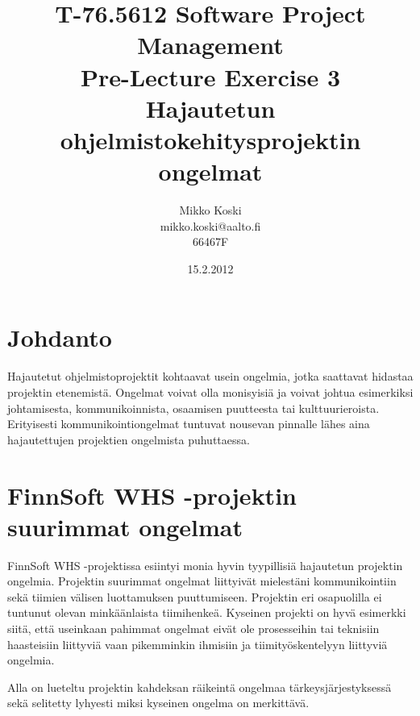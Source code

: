 \documentclass[a4paper]{article}
\begin{document}
\title{\small T-76.5612 Software Project Management \\ Pre-Lecture Exercise 3 \\ \huge Hajautetun ohjelmistokehitysprojektin ongelmat}
\date{15.2.2012}
\author{Mikko Koski \\ mikko.koski@aalto.fi \\ 66467F}
\maketitle

\normalsize

\section{Johdanto}

Hajautetut ohjelmistoprojektit kohtaavat usein ongelmia, jotka saattavat hidastaa projektin etenemistä. Ongelmat voivat olla monisyisiä ja voivat johtua esimerkiksi johtamisesta, kommunikoinnista, osaamisen puutteesta tai kulttuurieroista. Erityisesti kommunikointiongelmat tuntuvat nousevan pinnalle lähes aina hajautettujen projektien ongelmista puhuttaessa.

\section{FinnSoft WHS -projektin suurimmat ongelmat}

FinnSoft WHS -projektissa esiintyi monia hyvin tyypillisiä hajautetun projektin ongelmia. Projektin suurimmat ongelmat liittyivät mielestäni kommunikointiin sekä tiimien välisen luottamuksen puuttumiseen. Projektin eri osapuolilla ei tuntunut olevan minkäänlaista tiimihenkeä. Kyseinen projekti on hyvä esimerkki siitä, että useinkaan pahimmat ongelmat eivät ole prosesseihin tai teknisiin haasteisiin liittyviä vaan pikemminkin ihmisiin ja tiimityöskentelyyn liittyviä ongelmia.

Alla on lueteltu projektin kahdeksan räikeintä ongelmaa tärkeysjärjestyksessä sekä selitetty lyhyesti miksi kyseinen ongelma on merkittävä.

\end{document}
